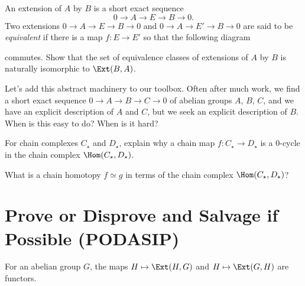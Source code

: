 \documentclass{homework}
\begin{document}
\begin{problem}
  An extension of $A$ by $B$ is a short exact sequence
  $$
  0 \to A \to E \to B \to 0.
  $$
  Two extensions $0 \to A \to E \to B \to 0$ and $0 \to A \to E' \to B
  \to 0$ are said to be \textit{equivalent} if there is a map $f : E \to E'$ so
  that the following diagram
  \begin{center}
\end{center}
commutes.  Show that the set of equivalence classes of extensions of
$A$ by $B$ is naturally isomorphic to $\Ext(B,A)$.
\end{problem}

\begin{problem}
Let's add this abstract machinery to our toolbox.
  Often after much work, we find a short exact sequence
  \(
   0 \to A \to B \to C \to 0
  \) of abelian groups $A$, $B$, $C$, and we have an explicit
description of $A$ and $C$, but we seek an explicit description of
$B$.  When is this easy to do?  When is it hard?
\end{problem}

\begin{problem}
  For chain complexes $C_\star$ and $D_\star$,
  explain why a chain map $f : C_\star \to D_\star$ is a $0$-cycle in the chain complex
  $\Hom(C_\star,D_\star)$.

 What is a chain homotopy $f \simeq g$ in terms of the chain complex 
 $\Hom(C_\star,D_\star)$?
\end{problem}

\section{Prove or Disprove and Salvage if Possible (PODASIP)}

\begin{problem}
  For an abelian group $G$, the maps $H \mapsto \Ext(H,G)$ and $H \mapsto \Ext(G,H)$ are functors.
\end{problem}

\end{document}
